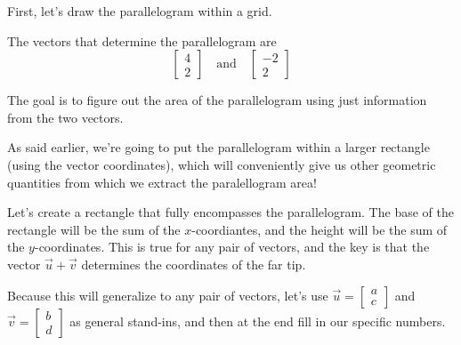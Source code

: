 \documentclass{ximera}
\begin{document}
    \begin{example}\label{ex:areaofparallelogram}
      First, let's draw the parallelogram within a grid.

      \begin{center}
      \end{center}

      \begin{explanation}

      The vectors that determine the parallelogram are
      $$\begin{bmatrix}4\\2\end{bmatrix}\quad\text{and}\quad\begin{bmatrix}-2\\2\end{bmatrix}$$

      The goal is to figure out the area of the parallelogram using just information from the two vectors. 

      As said earlier, we're going to put the parallelogram within a larger rectangle (using the vector coordinates), which will conveniently give us other geometric quantities from which we extract the paralellogram area!

      Let's create a rectangle that fully encompasses the parallelogram. The base of the rectangle will be the sum of the $x$-coordiantes, and the height will be the sum of the $y$-coordinates. This is true for any pair of vectors, and the key is that the vector $\vec{u}+\vec{v}$ determines the coordinates of the far tip. 

      Because this will generalize to any pair of vectors, let's use $\vec{u}=\begin{bmatrix}
        a\\c
      \end{bmatrix}$ and $\vec{v}=\begin{bmatrix}
        b\\d
      \end{bmatrix}$ as general stand-ins, and then at the end fill in our specific numbers.


\end{explanation}
\end{example}
\end{document}
